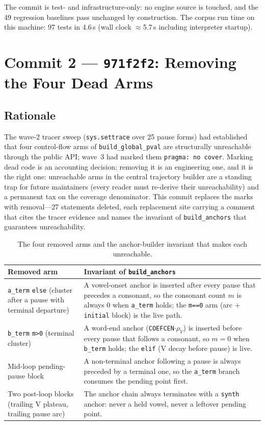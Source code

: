 \documentclass[11pt,a4paper]{article}
\newcommand{\code}[1]{\texttt{#1}}
\newcommand{\commit}[1]{\texttt{#1}}
\begin{document}
The commit is test- and infrastructure-only: no engine source is
touched, and the 49 regression baselines pass unchanged by
construction. The corpus run time on this machine: 97 tests in
4.6\,s (wall clock $\approx$5.7\,s including interpreter startup).

\section{Commit 2 --- \commit{971f2f2}: Removing the Four Dead Arms}
\label{sec:c2}

\subsection{Rationale}

The wave-2 tracer sweep (\code{sys.settrace} over 25 pause forms) had
established that four control-flow arms of
\code{build\_global\_pval} are structurally unreachable through the
public API; wave~3 had marked them \code{pragma: no cover}. Marking
dead code is an accounting decision; removing it is an engineering
one, and it is the right one: unreachable arms in the central
trajectory builder are a standing trap for future maintainers (every
reader must re-derive their unreachability) and a permanent tax on
the coverage denominator. This commit replaces the marks with
removal---27 statements deleted, each replacement site carrying a
comment that cites the tracer evidence and names the invariant of
\code{build\_anchors} that guarantees unreachability.

\begin{table}[htbp]
\centering
\caption{The four removed arms and the anchor-builder invariant that
makes each unreachable.}
\label{tab:arms}
\small
\begin{tabularx}{\textwidth}{@{ } l X }
\toprule
\textbf{Removed arm} & \textbf{Invariant of \code{build\_anchors}} \\
\midrule
\code{a\_term} \code{else} (cluster after a pause with terminal departure) &
A vowel-onset anchor is inserted after every pause that precedes a consonant, so the consonant count $m$ is always 0 when \code{a\_term} holds; the \code{m==0} arm (arc + \code{initial} block) is the live path. \\
\addlinespace
\code{b\_term} \code{m>0} (terminal cluster) &
A word-end anchor (\code{COEFCEN}$\cdot\rho_V$) is inserted before every pause that follows a consonant, so $m=0$ when \code{b\_term} holds; the \code{elif} (V decay before pause) is live. \\
\addlinespace
Mid-loop pending-pause block &
A non-terminal anchor following a pause is always preceded by a terminal one, so the \code{a\_term} branch consumes the pending point first. \\
\addlinespace
Two post-loop blocks (trailing V plateau, trailing pause arc) &
The anchor chain always terminates with a \code{synth} anchor: never a held vowel, never a leftover pending point. \\
\bottomrule
\end{tabularx}
\end{table}
\end{document}
